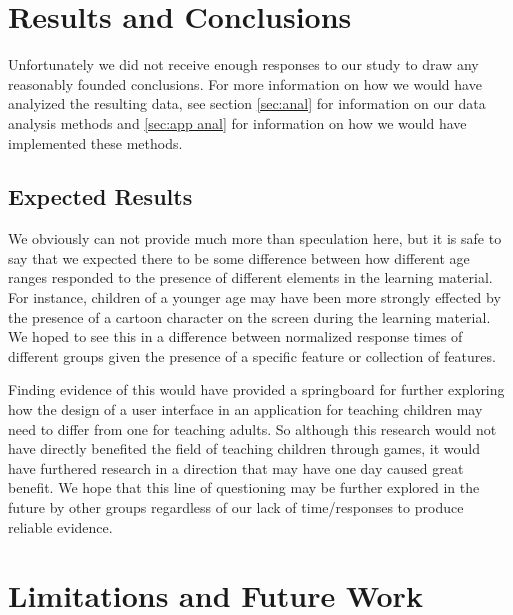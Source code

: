 \documentclass[12pt]{report}
\begin{document}
\chapter{Results and Conclusions}

Unfortunately we did not receive enough responses to our study to draw any reasonably founded conclusions. For more information on how we would have analyized the resulting data, see section \ref{sec:anal} for information on our data analysis methods and \ref{sec:app anal} for information on how we would have implemented these methods.

\section{Expected Results}

We obviously can not provide much more than speculation here, but it is safe to say that we expected there to be some difference between how different age ranges responded to the presence of different elements in the learning material. For instance, children of a younger age may have been more strongly effected by the presence of a cartoon character on the screen during the learning material. We hoped to see this in a difference between normalized response times of different groups given the presence of a specific feature or collection of features.

Finding evidence of this would have provided a springboard for further exploring how the design of a user interface in an application for teaching children may need to differ from one for teaching adults. So although this research would not have directly benefited the field of teaching children through games, it would have furthered research in a direction that may have one day caused great benefit. We hope that this line of questioning may be further explored in the future by other groups regardless of our lack of time/responses to produce reliable evidence.

\chapter{Limitations and Future Work}
\end{document}
